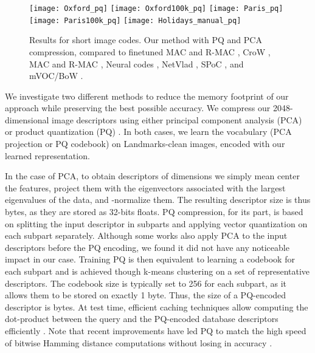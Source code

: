 \documentclass[twocolumn]{svjour3}          \smartqed  \usepackage{graphicx}
\begin{document}
\begin{figure*}[ht!]
  \begin{centering}
    \texttt{[image: Oxford\_pq]}
    \texttt{[image: Oxford100k\_pq]}
    \texttt{[image: Paris\_pq]}
    \texttt{[image: Paris100k\_pq]}
    \texttt{[image: Holidays\_manual\_pq]}
 \par\end{centering}
 \caption{\label{fig:pq}Results for short image codes. Our method with PQ and PCA compression, compared to finetuned MAC and R-MAC \citep{Radenovic2016}, CroW \citep{Kalantidis2016}, MAC and R-MAC \citep{Tolias2016}, Neural codes \citep{Babenko2014}, NetVlad \citep{Arandjelovic2016}, SPoC \citep{Gong2014}, and mVOC/BoW \citep{Radenovic2015}.}
\end{figure*}

We investigate two different methods to reduce the memory footprint of our approach while preserving the best possible accuracy.
We compress our 2048-dimensional image descriptors using either principal component analysis (PCA) or product quantization (PQ) \citep{PQ2011}.
In both cases, we learn the vocabulary (PCA projection or PQ codebook) on Landmarks-clean images, encoded with our learned representation. 

In the case of PCA, to obtain descriptors of  dimensions we simply mean center the features, project them with the eigenvectors associated with the  largest eigenvalues of the data, and -normalize them. 
The resulting descriptor size is thus  bytes, as they are stored as 32-bits floats.
PQ compression, for its part, is based on splitting the input descriptor in  subparts and applying vector quantization on each subpart separately.
Although some works also apply PCA to the input descriptors before the PQ encoding, we found it did not have any noticeable impact in our case.
Training PQ is then equivalent to learning a codebook for each subpart and is achieved though k-means clustering on a set of representative descriptors. 
The codebook size is typically set to 256 for each subpart, as it allows them to be stored on exactly 1 byte. Thus, the size of a PQ-encoded descriptor is  bytes.
At test time, efficient caching techniques allow computing the dot-product between the query and the PQ-encoded database descriptors efficiently \citep{PQ2011}. 
Note that recent improvements have led PQ to match the high speed of bitwise Hamming distance computations without losing in accuracy \citep{Douze2016}.
\end{document}
